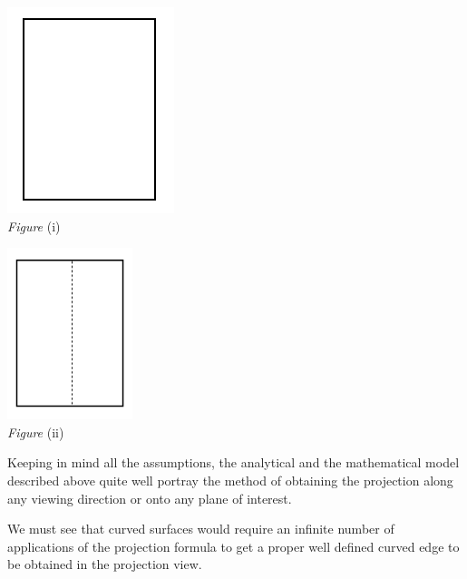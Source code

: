 \documentclass[12pt]{report}
\begin{document}
\begin{multicols*}{2}
  
  \begin{center}
    \includegraphics{view1prism.PNG}
      \\
    \textit{Figure} (i)
    \\
    
  \end{center}
  
  \columnbreak

  \begin{center}
  
  \includegraphics[height=5cm]{view2prism.PNG}
  \\
  \textit{Figure} (ii)  
  \\
  \end{center}

\end{multicols*}
\vspace{4cm}

Keeping in mind all the assumptions, the analytical and the mathematical model described above quite well portray the method of obtaining the projection along any viewing direction or onto any plane of interest.
\\
\vspace{0.3cm}

We must see that curved surfaces would require an infinite number of applications of the projection formula to get a proper well defined curved edge to be obtained in the projection view.
\end{document}

